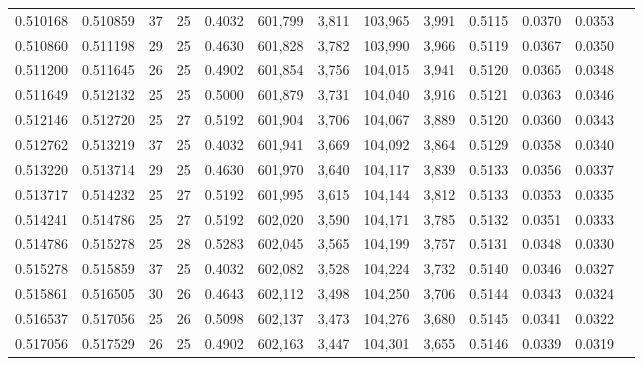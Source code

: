 \begin{tabular}{rrrrrrrrrrrrr}
0.510168 & 0.510859 &    37 &  25 &                                     0.4032 & 601,799 &   3,811 & 103,965 &   3,991 & 0.5115 & 0.0370 & 0.0353 \\
0.510860 & 0.511198 &    29 &  25 &                                     0.4630 & 601,828 &   3,782 & 103,990 &   3,966 & 0.5119 & 0.0367 & 0.0350 \\
0.511200 & 0.511645 &    26 &  25 &                                     0.4902 & 601,854 &   3,756 & 104,015 &   3,941 & 0.5120 & 0.0365 & 0.0348 \\
0.511649 & 0.512132 &    25 &  25 &                                     0.5000 & 601,879 &   3,731 & 104,040 &   3,916 & 0.5121 & 0.0363 & 0.0346 \\
0.512146 & 0.512720 &    25 &  27 &                                     0.5192 & 601,904 &   3,706 & 104,067 &   3,889 & 0.5120 & 0.0360 & 0.0343 \\
0.512762 & 0.513219 &    37 &  25 &                                     0.4032 & 601,941 &   3,669 & 104,092 &   3,864 & 0.5129 & 0.0358 & 0.0340 \\
0.513220 & 0.513714 &    29 &  25 &                                     0.4630 & 601,970 &   3,640 & 104,117 &   3,839 & 0.5133 & 0.0356 & 0.0337 \\
0.513717 & 0.514232 &    25 &  27 &                                     0.5192 & 601,995 &   3,615 & 104,144 &   3,812 & 0.5133 & 0.0353 & 0.0335 \\
0.514241 & 0.514786 &    25 &  27 &                                     0.5192 & 602,020 &   3,590 & 104,171 &   3,785 & 0.5132 & 0.0351 & 0.0333 \\
0.514786 & 0.515278 &    25 &  28 &                                     0.5283 & 602,045 &   3,565 & 104,199 &   3,757 & 0.5131 & 0.0348 & 0.0330 \\
0.515278 & 0.515859 &    37 &  25 &                                     0.4032 & 602,082 &   3,528 & 104,224 &   3,732 & 0.5140 & 0.0346 & 0.0327 \\
0.515861 & 0.516505 &    30 &  26 &                                     0.4643 & 602,112 &   3,498 & 104,250 &   3,706 & 0.5144 & 0.0343 & 0.0324 \\
0.516537 & 0.517056 &    25 &  26 &                                     0.5098 & 602,137 &   3,473 & 104,276 &   3,680 & 0.5145 & 0.0341 & 0.0322 \\
0.517056 & 0.517529 &    26 &  25 &                                     0.4902 & 602,163 &   3,447 & 104,301 &   3,655 & 0.5146 & 0.0339 & 0.0319 \\

\end{tabular}
